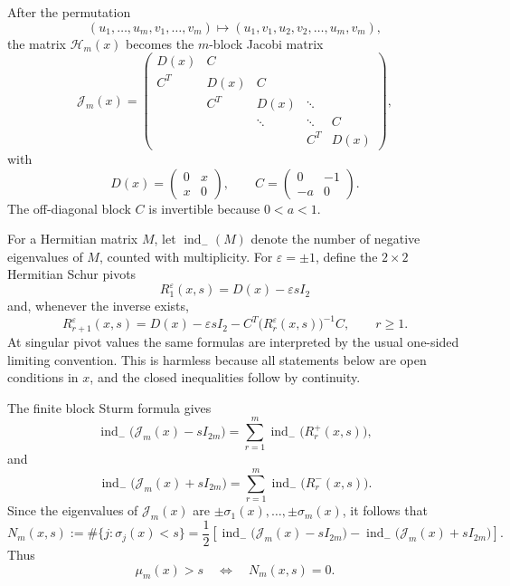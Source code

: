 \documentclass[11pt]{amsart}
\numberwithin{equation}{section}
\DeclareMathOperator{\ind}{ind}
\begin{document}
After the permutation
\[
        (u_1,\dots,u_m,v_1,\dots,v_m)
        \longmapsto
        (u_1,v_1,u_2,v_2,\dots,u_m,v_m),
\]
the matrix \(\mathcal H_m(x)\) becomes the \(m\)-block Jacobi matrix
\[
        \mathcal J_m(x)
        =
        \begin{pmatrix}
        D(x)&C&&&\\
        C^T&D(x)&C&&\\
        &C^T&D(x)&\ddots&\\
        &&\ddots&\ddots&C\\
        &&&C^T&D(x)
        \end{pmatrix},
\]
with
\[
        D(x)=
        \begin{pmatrix}
        0&x\\
        x&0
        \end{pmatrix},
        \qquad
        C=
        \begin{pmatrix}
        0&-1\\
        -a&0
        \end{pmatrix}.
\]
The off-diagonal block \(C\) is invertible because \(0<a<1\).

For a Hermitian matrix \(M\), let \(\ind_-(M)\) denote the number of negative
eigenvalues of \(M\), counted with multiplicity.  For \(\varepsilon=\pm1\),
define the \(2\times2\) Hermitian Schur pivots
\[
        R_1^{\varepsilon}(x,s)
        =
        D(x)-\varepsilon sI_2
\]
and, whenever the inverse exists,
\[
        R_{r+1}^{\varepsilon}(x,s)
        =
        D(x)-\varepsilon sI_2
        -
        C^T\bigl(R_r^{\varepsilon}(x,s)\bigr)^{-1}C,
        \qquad r\ge1.
\]
At singular pivot values the same formulas are interpreted by the usual
one-sided limiting convention.  This is harmless because all statements below
are open conditions in \(x\), and the closed inequalities follow by continuity.

The finite block Sturm formula gives
\[
        \ind_-\bigl(\mathcal J_m(x)-sI_{2m}\bigr)
        =
        \sum_{r=1}^{m}\ind_-\bigl(R_r^{+}(x,s)\bigr),
\]
and
\[
        \ind_-\bigl(\mathcal J_m(x)+sI_{2m}\bigr)
        =
        \sum_{r=1}^{m}\ind_-\bigl(R_r^{-}(x,s)\bigr).
\]
Since the eigenvalues of \(\mathcal J_m(x)\) are
\(\pm\sigma_1(x),\dots,\pm\sigma_m(x)\), it follows that
\[
        N_m(x,s)
        :=
        \#\{j:\sigma_j(x)<s\}
        =
        \frac12
        \left[
        \ind_-\bigl(\mathcal J_m(x)-sI_{2m}\bigr)
        -
        \ind_-\bigl(\mathcal J_m(x)+sI_{2m}\bigr)
        \right].
\]
Thus
\[
        \mu_m(x)>s
        \quad\Longleftrightarrow\quad
        N_m(x,s)=0.
\]
\end{document}
